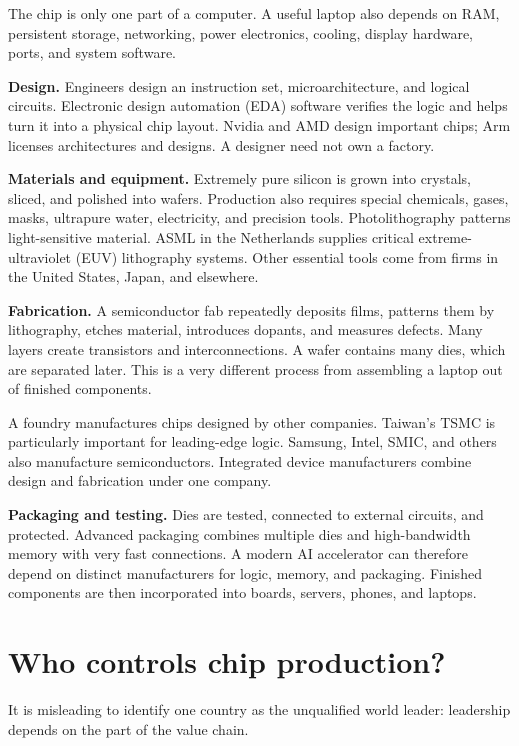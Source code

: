 The chip is only one part of a computer.
A useful laptop also depends on RAM,
persistent storage, networking, power
electronics, cooling, display hardware,
ports, and system software.

\medskip\noindent
{\bf Design.}
Engineers design an instruction set,
microarchitecture, and logical circuits.
Electronic design automation (EDA)
software verifies the logic and helps
turn it into a physical chip layout.
Nvidia and AMD design important chips;
Arm licenses architectures and designs.
A designer need not own a factory.

\medskip\noindent
{\bf Materials and equipment.}
Extremely pure silicon is grown into
crystals, sliced, and polished into
wafers. Production also requires
special chemicals, gases, masks,
ultrapure water, electricity, and
precision tools. Photolithography
patterns light-sensitive material.
ASML in the Netherlands supplies
critical extreme-ultraviolet (EUV)
lithography systems. Other essential
tools come from firms in the United
States, Japan, and elsewhere.

\medskip\noindent
{\bf Fabrication.}
A semiconductor fab repeatedly deposits
films, patterns them by lithography,
etches material, introduces dopants,
and measures defects. Many layers
create transistors and interconnections.
A wafer contains many dies, which
are separated later. This is a very
different process from assembling
a laptop out of finished components.

A foundry manufactures chips designed
by other companies. Taiwan's TSMC
is particularly important for
leading-edge logic. Samsung, Intel,
SMIC, and others also manufacture
semiconductors. Integrated device
manufacturers combine design and
fabrication under one company.

\medskip\noindent
{\bf Packaging and testing.}
Dies are tested, connected to external
circuits, and protected. Advanced
packaging combines multiple dies and
high-bandwidth memory with very fast
connections. A modern AI accelerator
can therefore depend on distinct
manufacturers for logic, memory,
and packaging. Finished components
are then incorporated into boards,
servers, phones, and laptops.

\section{Who controls chip production?}

It is misleading to identify one
country as the unqualified world
leader: leadership depends on the
part of the value chain.

